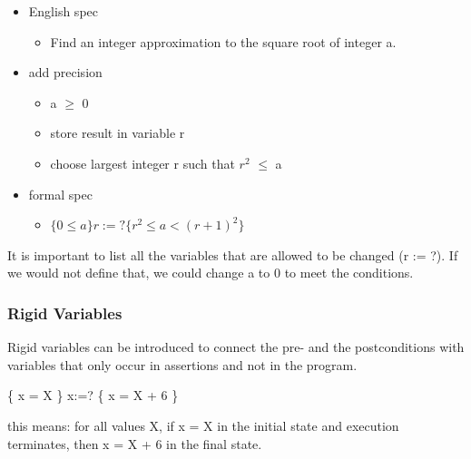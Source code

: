 \begin{itemize}
\tightlist
\item
  English spec

  \begin{itemize}
  \tightlist
  \item
    Find an integer approximation to the square root of integer a.
  \end{itemize}
\item
  add precision

  \begin{itemize}
  \tightlist
  \item
    a $\geqslant$ 0
  \item
    store result in variable r
  \item
    choose largest integer r such that $r^2$ $\leqslant$ a
  \end{itemize}
\item
  formal spec

  \begin{itemize}
  \tightlist
  \item $\{0 \leqslant a\} r:=? \{r^2 \leqslant a < (r + 1)^2\}$
  \end{itemize}
\end{itemize}

It is important to list all the variables that are allowed to be changed
(r := ?). If we would not define that, we could change a to 0 to meet
the conditions.

\hypertarget{rigid-variables}{%
\subsubsection{Rigid Variables}\label{rigid-variables}}

Rigid variables can be introduced to connect the pre- and the
postconditions with variables that only occur in assertions and not in
the program.

\{ x = X \} x:=? \{ x = X + 6 \}

this means: for all values X, if x = X in the initial state and
execution terminates, then x = X + 6 in the final state.

\clearpage
